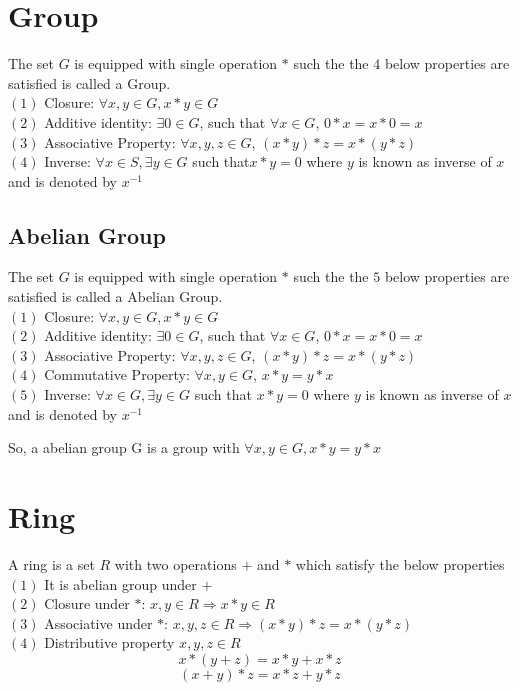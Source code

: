 \documentclass[12pt,a4paper]{report}
\begin{document}
\section{Group}
The set  $G$ is equipped with  single operation $*$ such the the $4$ below properties are satisfied is called a Group.\\
$(1)$ Closure: $\forall x,y \in G, x*y \in G$ \\
$(2)$ Additive identity: $\exists 0 \in G$, such that $ \forall x \in G$, $ 0*x=x*0=x$\\
$(3)$ Associative Property: $ \forall x,y,z \in G$, $(x*y)*z=x*(y*z)$ \\
$(4)$ Inverse: $ \forall x \in S, \exists y \in G$ such that$x*y=0$ where $y$ is known as inverse of $x$ and is denoted by $x^{-1}$
\subsection{Abelian Group}
The set $G$ is equipped with  single operation $*$ such the the $5$ below properties are satisfied is called a Abelian Group.\\
$(1)$ Closure: $\forall x,y \in G, x*y \in G$ \\
$(2)$ Additive identity: $\exists 0 \in G$, such that $ \forall x \in G$, $ 0*x=x*0=x$\\
$(3)$ Associative Property: $ \forall x,y,z \in G$, $(x*y)*z=x*(y*z)$ \\
$(4)$ Commutative Property: $ \forall x,y \in G$, $x*y=y*x$ \\
$(5)$ Inverse: $ \forall x \in G, \exists y \in G$ such that $x*y=0$ where $y$ is known as inverse of $x$ and is denoted by $x^{-1}$	
	
So, a abelian group G is a group with $\forall x,y \in G, x*y=y*x$
\cleardoublepage
	
\section{Ring}
A ring is a set $R$ with two operations $+$ and $*$ which satisfy the below properties\\
$(1)$ It is abelian group under $+$ \\
$(2)$ Closure under $*$:  $x,y \in R \Rightarrow	x*y \in R $  \\
$(3)$ Associative under $*$: $x,y,z \in R \Rightarrow	(x*y)*z=x*(y*z) $\\
$(4)$ Distributive property $x,y,z \in R$
$$x*(y+z)=x*y+x*z$$ $$(x+y)*z=x*z+y*z$$
	
\end{document}
